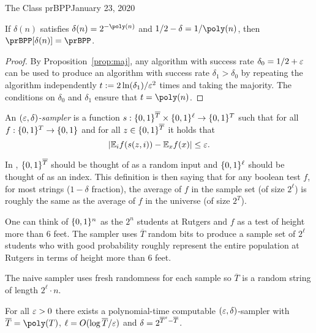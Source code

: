 \begin{lecture}{1}{The Class prBPP}{January 23, 2020}
\begin{corollary}\label{cor:bpp-small-error}
  If $\delta(n)$ satisfies $\delta(n) = 2^{-\poly(n)}$ and $1/2 - \delta =
  1/\poly(n)$, then $\prBPP[\delta(n)] = \prBPP$.
\end{corollary}

\begin{proof}
  By Proposition~\ref{prop:maj}, any algorithm with success rate $\delta_0 =
  1/2 + \varepsilon$ can be used to produce an algorithm with success rate $\delta_1 >
  \delta_0$ by repeating the algorithm independently $t :=
  2\ln(\delta_1)/\varepsilon^2$ times and taking the majority. The conditions on
  $\delta_0$ and $\delta_1$ ensure that $t = \poly(n)$.
\end{proof}


\begin{definition}\label{def:sampler}
  An \emph{$(\varepsilon, \delta)$-sampler} is a function $s :
  \{0,1\}^{\overline{T}} \times \{0,1\}^\ell \to \{0,1\}^T$ such that for
  all $f : \{0,1\}^T \to \{0,1\}$ and for all $z \in
  \{0,1\}^{\overline{T}}$ it holds that
  \[ |\mathbb{E}_i f(s(z, i)) - \mathbb{E}_x f(x)| \le \varepsilon.  \]
\end{definition}

In , $\{0,1\}^{\overline{T}}$ should be thought of as a random input and $\{0,1\}^\ell$ should be thought of as an index. This definition is then saying that for any boolean test $f$, for most strings ($1-\delta$ fraction), the average of $f$ in the sample set (of size $2^{\ell}$) is roughly the same as the average of $f$ in the universe (of size $2^T$).

One can think of $\{0,1\}^n$ as the $2^n$ students at Rutgers and $f$ as a test of height more than $6$ feet. The sampler uses $\overline{T}$ random bits to produce a sample set of $2^\ell$ students who with good probability roughly represent the entire population at Rutgers in terms of height more than $6$ feet.

The naive sampler uses fresh randomness for each sample so $\overline{T}$ is a random string of length $2^\ell \cdot n$.


\begin{theorem}
  For all $\varepsilon > 0$ there exists a polynomial-time computable $(\varepsilon,
  \delta)$-sampler with $\overline{T} = \poly(T)$, $\ell = O(\log
  \overline{T}/\varepsilon)$ and $\delta = 2^{\overline{T}^\varepsilon - \overline{T}}$.
\end{theorem}


\end{lecture}
